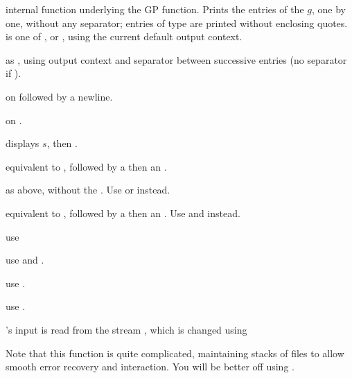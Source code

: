 
 internal function underlying the
 GP function. Prints the entries of the  $g$, one by one,
without any separator; entries of type  are printed without enclosing
quotes. \fl is one of ,  or , using the
current default output context.

 as
, using output context  and separator  between
successive entries (no separator if ).

  on
 followed by a newline.

  on
.

 displays $s$,
then .

 equivalent to , followed
by a  then an .

 as above, without the . Use
 or  instead.

 equivalent to , followed
by a  then an . Use  and
 instead.


 use 

 use  and
.

 use .

 use .


's input is read from the stream , which is changed
using


Note that this function is quite complicated, maintaining stacks of files
to allow smooth error recovery and  interaction. You will be better
off using .

